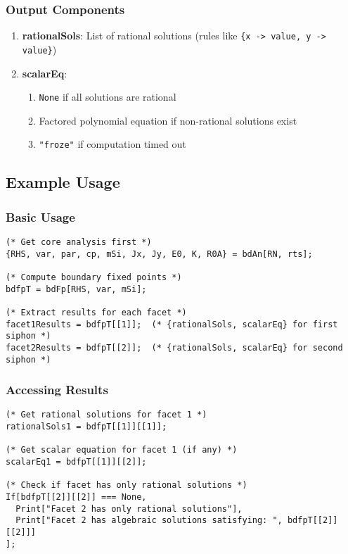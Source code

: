 \documentclass{article}
\begin{document}
\subsubsection{Output Components}
\begin{enumerate}
\item \textbf{rationalSols}: List of rational solutions (rules like \texttt{\{x -> value, y -> value\}})
\item \textbf{scalarEq}:
\begin{enumerate}
\item \texttt{None} if all solutions are rational
\item Factored polynomial equation if non-rational solutions exist
\item \texttt{"froze"} if computation timed out
\end{enumerate}
\end{enumerate}

\subsection{Example Usage}

\subsubsection{Basic Usage}
\begin{lstlisting}
(* Get core analysis first *)
{RHS, var, par, cp, mSi, Jx, Jy, E0, K, R0A} = bdAn[RN, rts];

(* Compute boundary fixed points *)
bdfpT = bdFp[RHS, var, mSi];

(* Extract results for each facet *)
facet1Results = bdfpT[[1]];  (* {rationalSols, scalarEq} for first siphon *)
facet2Results = bdfpT[[2]];  (* {rationalSols, scalarEq} for second siphon *)
\end{lstlisting}

\subsubsection{Accessing Results}
\begin{lstlisting}
(* Get rational solutions for facet 1 *)
rationalSols1 = bdfpT[[1]][[1]];

(* Get scalar equation for facet 1 (if any) *)
scalarEq1 = bdfpT[[1]][[2]];

(* Check if facet has only rational solutions *)
If[bdfpT[[2]][[2]] === None,
  Print["Facet 2 has only rational solutions"],
  Print["Facet 2 has algebraic solutions satisfying: ", bdfpT[[2]][[2]]]
];
\end{lstlisting}
\end{document}
